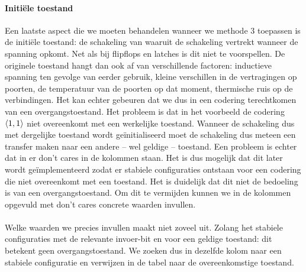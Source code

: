 \paragraph{Initi\"ele toestand}
Een laatste aspect die we moeten behandelen wanneer we methode $3$ toepassen is de initi\"ele toestand: de schakeling van waaruit de schakeling vertrekt wanneer de spanning opkomt. Net als bij flipflops en latches is dit niet te voorspellen. De originele toestand hangt dan ook af van verschillende factoren: inductieve spanning ten gevolge van eerder gebruik, kleine verschillen in de vertragingen op poorten, de temperatuur van de poorten op dat moment, thermische ruis op de verbindingen. Het kan echter gebeuren dat we dus in een codering terechtkomen van een overgangstoestand. Het probleem is dat in het voorbeeld de codering $\left\langle 1,1 \right\rangle$ niet overeenkomt met een werkelijke toestand. Wanneer de schakeling dus met dergelijke toestand wordt ge\"initialiseerd moet de schakeling dus meteen een transfer maken naar een andere -- wel geldige -- toestand. Een probleem is echter dat in  er don't cares in de kolommen staan. Het is dus mogelijk dat dit later wordt ge\"implementeerd zodat er stabiele configuraties ontstaan voor een codering die niet overeenkomt met een toestand. Het is duidelijk dat dit niet de bedoeling is van een overgangstoestand. Om dit te vermijden kunnen  we in de kolommen opgevuld met don't cares concrete waarden invullen.
\paragraph{}
Welke waarden we precies invullen maakt niet zoveel uit. Zolang het stabiele configuraties met de relevante invoer-bit en voor een geldige toestand: dit betekent geen overgangstoestand. We zoeken dus in dezelfde kolom naar een stabiele configuratie en verwijzen in de tabel naar de overeenkomstige toestand.
